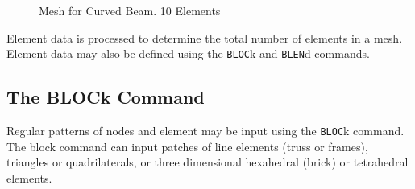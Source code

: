 \begin{figure}[ht!]
\epsfxsize=1.6in
\centerline {\hfil {} \hfil}
\caption{Mesh for Curved Beam.  10 Elements}
\label{fig72}
\end{figure}

Element data is processed to determine the total number of elements in a mesh.
Element data may also be defined using the {\tt BLOC}k and {\tt BLEN}d commands.

\subsection{The BLOCk Command}
\label{block}

Regular patterns of nodes and element may be input using the
{\tt BLOC}k command.  The block command can input patches of line
elements (truss or frames), triangles or quadrilaterals, or three
dimensional hexahedral (brick) or tetrahedral elements.

